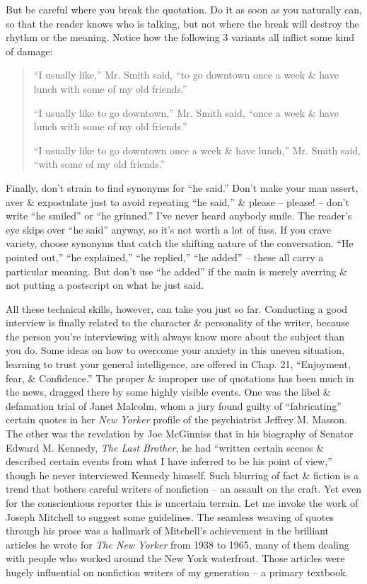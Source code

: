 \documentclass{article}
\begin{document}
But be careful where you break the quotation. Do it as soon as you naturally can, so that the reader knows who is talking, but not where the break will destroy the rhythm or the meaning. Notice how the following 3 variants all inflict some kind of damage:
\begin{quotation}
	``I usually like,'' Mr. Smith said, ``to go downtown once a week \& have lunch with some of my old friends.''
	
	``I usually like to go downtown,'' Mr. Smith said, ``once a week \& have lunch with some of my old friends.''
	
	``I usually like to go downtown once a week \& have lunch,'' Mr. Smith said, ``with some of my old friends.''
\end{quotation}
Finally, don't strain to find synonyms for ``he said.'' Don't make your man assert, aver \& expostulate just to avoid repeating ``he said,'' \& please -- please! -- don't write ``he smiled'' or ``he grinned.'' I've never heard anybody smile. The reader's eye skips over ``he said'' anyway, so it's not worth a lot of fuss. If you crave variety, choose synonyms that catch the shifting nature of the conversation. ``He pointed out,'' ``he explained,'' ``he replied,'' ``he added'' -- these all carry a particular meaning. But don't use ``he added'' if the main is merely averring \& not putting a postscript on what he just said.

All these technical skills, however, can take you just so far. Conducting a good interview is finally related to the character \& personality of the writer, because the person you're interviewing with always know more about the subject than you do. Some ideas on how to overcome your anxiety in this uneven situation, learning to trust your general intelligence, are offered in Chap. 21, ``Enjoyment, fear, \& Confidence.'' The proper \& improper use of quotations has been much in the news, dragged there by some highly visible events. One was the libel \& defamation trial of Janet Malcolm, whom a jury found guilty of ``fabricating'' certain quotes in her \textit{New Yorker} profile of the psychiatrist Jeffrey M. Masson. The other was the revelation by Joe McGinniss that in his biography of Senator Edward M. Kennedy, \textit{The Last Brother}, he had ``written certain scenes \& described certain events from what I have inferred to be his point of view,'' though he never interviewed Kennedy himself. Such blurring of fact \& fiction is a trend that bothers careful writers of nonfiction -- an assault on the craft. Yet even for the conscientious reporter this is uncertain terrain. Let me invoke the work of Joseph Mitchell to suggest some guidelines. The seamless weaving of quotes through his prose was a hallmark of Mitchell's achievement in the brilliant articles he wrote for \textit{The New Yorker} from 1938 to 1965, many of them dealing with people who worked around the New York waterfront. Those articles were hugely influential on nonfiction writers of my generation -- a primary textbook.
\end{document}
